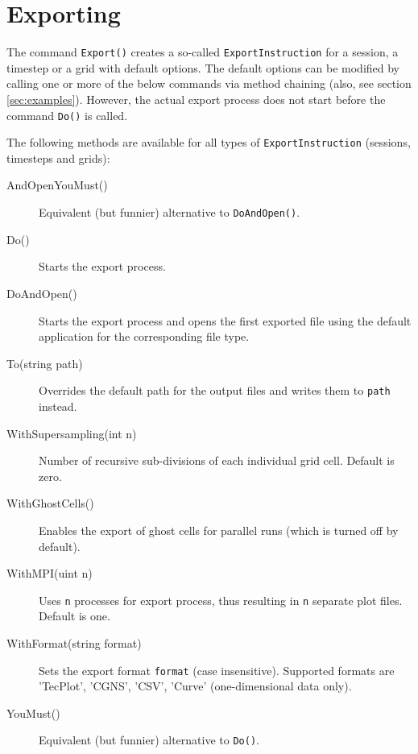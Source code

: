 \section{Exporting}
\label{sec:exporting}

The command \lstinline{Export()} creates a so-called \lstinline{ExportInstruction} for a session, a timestep or a grid with default options. The default options can be modified by calling one or more of the below commands via method chaining (also, see section \ref{sec:examples}). However, the actual export process does not start before the command \lstinline{Do()} is called.

The following methods are available for all types of \lstinline{ExportInstruction} (sessions, timesteps and grids):
\begin{description}
	\item[AndOpenYouMust()]
	Equivalent (but funnier) alternative to \lstinline{DoAndOpen()}.
	
	\item[Do()]
	Starts the export process.
	
	\item[DoAndOpen()]
	Starts the export process and opens the first exported file using the default application for the corresponding file type.
	
	\item[To(string path)]
	Overrides the default path for the output files and writes them to \lstinline{path} instead.
	
	\item[WithSupersampling(int n)]
	Number of recursive sub-divisions of each individual grid cell. Default is zero.
	
	\item[WithGhostCells()]
	Enables the export of ghost cells for parallel runs (which is turned off by default).
	
	\item[WithMPI(uint n)]
	Uses \lstinline{n} processes for export process, thus resulting in \lstinline{n} separate plot files. Default is one.
	
	\item[WithFormat(string format)]
	Sets the export format \lstinline{format} (case insensitive). Supported formats are 'TecPlot', 'CGNS', 'CSV', 'Curve' (one-dimensional data only).
	
	\item[YouMust()]
	Equivalent (but funnier) alternative to \lstinline{Do()}.
\end{description}

